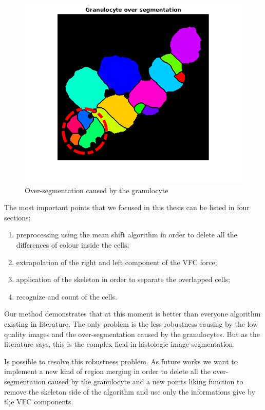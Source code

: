 \begin{figure}
\begin{center}
		\includegraphics[scale=0.5]{img/final/fingran.png}
		\caption{Over-segmentation caused by the granulocyte}
		\label{fig:gran}
\end{center}
\end{figure}

The most important points that we focused in this thesis can be listed in four sections:
\bigskip

\begin{minipage}{\linewidth}
\begin{enumerate}
\item preprocessing using the mean shift algorithm in order to delete all the differences of colour inside the cells;
\item extrapolation of the right and left component of the VFC force;
\item application of the skeleton in order to separate the overlapped cells;
\item recognize and count of the cells.
\end{enumerate}
\end{minipage}

\bigskip

Our method demonstrates that at this moment is better than everyone algorithm existing in literature. The only problem is the less robustness causing by the low quality images and the over-segmentation caused by the granulocytes. But as the literature says, this is the complex field in histologic image segmentation.

\bigskip

Is possible to resolve this robustness problem. As future works we want to implement a new kind of region merging in order to delete all the over-segmentation caused by the granulocyte and a new points liking function to remove the skeleton side of the algorithm and use only the informations give by the VFC components. 